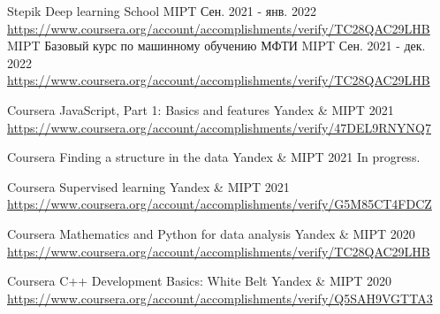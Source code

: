 

\begin{cventries}

    \cventry
    {Stepik} %
    {Deep learning School} %
    {MIPT} %
    {Сен. 2021 - янв. 2022} %
    {
        \href{https://www.coursera.org/account/accomplishments/verify/TC28QAC29LHB}{https://www.coursera.org/account/accomplishments/verify/TC28QAC29LHB}
    }
    \cventry
    {MIPT} %
    {Базовый курс по машинному обучению МФТИ} %
    {MIPT} %
    {Сен. 2021 - дек. 2022} %
    {
        \href{https://www.coursera.org/account/accomplishments/verify/TC28QAC29LHB}{https://www.coursera.org/account/accomplishments/verify/TC28QAC29LHB}
    }

    \cventry
    {Coursera} %
    {JavaScript, Part 1: Basics and features} %
    {Yandex \& MIPT} %
    {2021} %
    {
        \href{https://www.coursera.org/account/accomplishments/verify/47DEL9RNYNQ7}{https://www.coursera.org/account/accomplishments/verify/47DEL9RNYNQ7}
    }

    \cventry
    {Coursera} %
    {Finding a structure in the data} %
    {Yandex \& MIPT} %
    {2021} %
    {
        In progress.
    }

    \cventry
    {Coursera} %
    {Supervised learning} %
    {Yandex \& MIPT} %
    {2021} %
    {
        \href{https://www.coursera.org/account/accomplishments/verify/G5M85CT4FDCZ}{https://www.coursera.org/account/accomplishments/verify/G5M85CT4FDCZ}
    }

    \cventry
    {Coursera} %
    {Mathematics and Python for data analysis} %
    {Yandex \& MIPT} %
    {2020} %
    {
        \href{https://www.coursera.org/account/accomplishments/verify/TC28QAC29LHB}{https://www.coursera.org/account/accomplishments/verify/TC28QAC29LHB}
    }

    \cventry
    {Coursera} %
    {C++ Development Basics: White Belt} %
    {Yandex \& MIPT} %
    {2020} %
    {
        \href{https://www.coursera.org/account/accomplishments/verify/Q5SAH9VGTTA3}{https://www.coursera.org/account/accomplishments/verify/Q5SAH9VGTTA3}
    }
\end{cventries}
